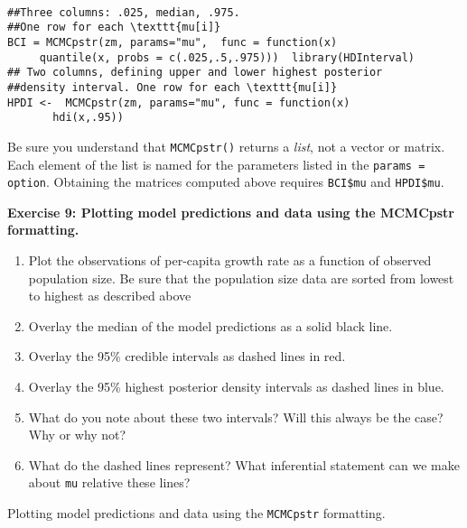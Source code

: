 \documentclass[12pt,english]{article}
\begin{document}
\begin{Verbatim}

##Three columns: .025, median, .975. 
##One row for each \texttt{mu[i]}
BCI = MCMCpstr(zm, params="mu",  func = function(x)
     quantile(x, probs = c(.025,.5,.975)))  library(HDInterval)
## Two columns, defining upper and lower highest posterior 
##density interval. One row for each \texttt{mu[i]}
HPDI <-  MCMCpstr(zm, params="mu", func = function(x) 
       hdi(x,.95))  
\end{Verbatim}

Be sure you understand that \texttt{MCMCpstr()} returns a \emph{list}, not a vector or matrix. Each element of the list is named for the parameters listed in the \texttt{params = option}. Obtaining the matrices computed above requires \texttt{BCI\$mu} and \texttt{HPDI\$mu}.



\bigskip
\belowcaptionskip=-40pt
\begin{exercise}
\begin{mdframed}
\doublespacing
\textbf{Exercise 9: Plotting model predictions and data using the MCMCpstr formatting.} 

\begin{enumerate}
\item Plot the observations of per-capita growth rate as a function of observed population size. Be sure that the population size data are sorted from lowest to highest as described above
\item Overlay the median of the model predictions as a solid black line. 
\item Overlay the 95\% credible intervals as dashed lines in red.  
\item Overlay the 95\% highest posterior density intervals as dashed lines in blue.
\item What do you note about these two intervals? Will this always be the case? Why or why not?
\item What do the dashed lines represent?  What inferential statement can we make about \texttt{mu} relative these lines?
\end{enumerate}
\end{mdframed}
\captionsetup{textformat=empty, labelformat=empty}
\caption[Plotting model predictions and data using the \texttt{MCMCpstr} formatting]{Plotting model predictions and data using the \texttt{MCMCpstr} formatting.}
\label{ex:plotting objects}
\end{exercise}
\belowcaptionskip=0pt
\end{document}
